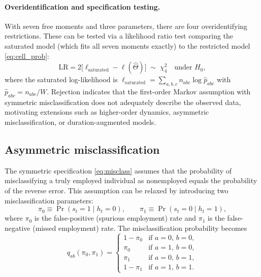\paragraph{Overidentification and specification testing.}
With seven free moments and three parameters, there are four
overidentifying restrictions. These can be tested via a likelihood ratio
test comparing the saturated model (which fits all seven moments
exactly) to the restricted model \eqref{eq:cell_prob}:
\begin{equation}
\mathrm{LR} = 2\big[\ell_{\text{saturated}} - \ell(\hat\Theta)\big]
\;\sim\; \chi^2_4 \quad \text{under } H_0,
\label{eq:overid_test}
\end{equation}
where the saturated log-likelihood is
\(\ell_{\text{saturated}} = \sum_{a,b,c} n_{abc} \log \hat{p}_{abc}\)
with \(\hat{p}_{abc} = n_{abc}/W\). Rejection indicates that the
first-order Markov assumption with symmetric misclassification does not
adequately describe the observed data, motivating extensions such as
higher-order dynamics, asymmetric misclassification, or duration-augmented
models.

\subsection{Asymmetric misclassification}
\label{sec:asymmetric}

The symmetric specification \eqref{eq:misclass} assumes that the
probability of misclassifying a truly employed individual as nonemployed
equals the probability of the reverse error. This assumption can be
relaxed by introducing two misclassification parameters:
\begin{equation}
\pi_0 \equiv \Pr(s_t = 1 \mid h_t = 0), \qquad
\pi_1 \equiv \Pr(s_t = 0 \mid h_t = 1),
\label{eq:asymmetric_pi}
\end{equation}
where \(\pi_0\) is the false-positive (spurious employment) rate and
\(\pi_1\) is the false-negative (missed employment) rate. The
misclassification probability becomes
\[
q_{ab}(\pi_0, \pi_1) =
\begin{cases}
1 - \pi_0 & \text{if } a = 0,\, b = 0, \\
\pi_0     & \text{if } a = 1,\, b = 0, \\
\pi_1     & \text{if } a = 0,\, b = 1, \\
1 - \pi_1 & \text{if } a = 1,\, b = 1.
\end{cases}
\]


